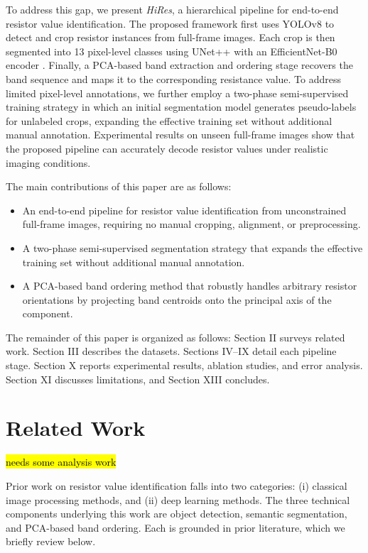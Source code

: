 \documentclass[conference]{IEEEtran}
\begin{document}
To address this gap, we present \textit{HiRes}, a hierarchical pipeline for end-to-end resistor value identification. The proposed framework first uses YOLOv8 \cite{jocher2023ultralytics} to detect and crop resistor instances from full-frame images. Each crop is then segmented into 13 pixel-level classes using UNet++ \cite{zhou2020unetredesigningskipconnections} with an EfficientNet-B0 encoder \cite{tan2019efficientnet}. Finally, a PCA-based band extraction and ordering stage recovers the band sequence and maps it to the corresponding resistance value. To address limited pixel-level annotations, we further employ a two-phase semi-supervised training strategy in which an initial segmentation model generates pseudo-labels for unlabeled crops, expanding the effective training set without additional manual annotation. Experimental results on unseen full-frame images show that the proposed pipeline can accurately decode resistor values under realistic imaging conditions.

The main contributions of this paper are as follows:
\begin{itemize}
  \item An end-to-end pipeline for resistor value identification from unconstrained full-frame images, requiring no manual cropping, alignment, or preprocessing.
  \item A two-phase semi-supervised segmentation strategy that expands the effective training set without additional manual annotation.
  \item A PCA-based band ordering method that robustly handles arbitrary resistor orientations by projecting band centroids onto the principal axis of the component.
\end{itemize}

The remainder of this paper is organized as follows: Section II surveys related work. Section III describes the datasets. Sections IV–IX detail each pipeline stage. Section X reports
experimental results, ablation studies, and error analysis. Section XI discusses limitations, and Section XIII concludes.
 
\section{Related Work}
\label{sec:related work}
\hl{needs some analysis work}

Prior work on resistor value identification falls into two categories: (i) classical image processing methods, and (ii) deep learning methods. The three technical components underlying this work are object detection, semantic segmentation, and PCA-based band ordering. Each is grounded in prior literature, which we briefly review below.
\end{document}
